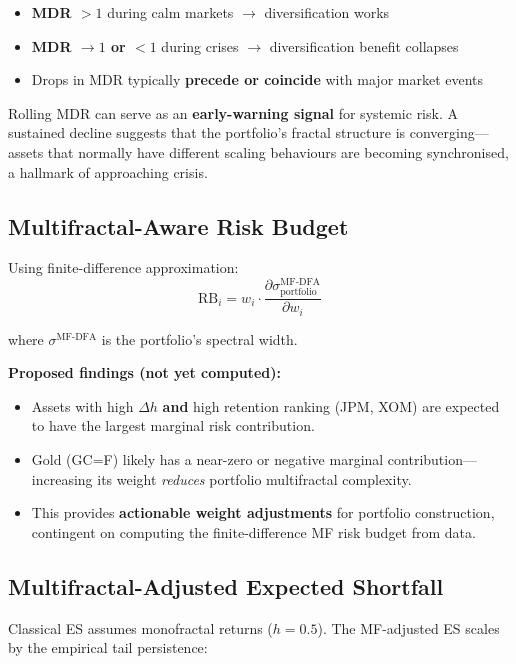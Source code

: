 \documentclass[11pt,a4paper]{article}
\begin{document}
\begin{itemize}[nosep]
\item \textbf{MDR $> 1$} during calm markets $\to$ diversification works
\item \textbf{MDR $\to 1$ or $< 1$} during crises $\to$ diversification benefit collapses
\item Drops in MDR typically \textbf{precede or coincide} with major market events
\end{itemize}

\begin{tipbox}
Rolling MDR can serve as an \textbf{early-warning signal} for systemic risk. A sustained decline suggests that the portfolio's fractal structure is converging---assets that normally have different scaling behaviours are becoming synchronised, a hallmark of approaching crisis.
\end{tipbox}

\subsection{Multifractal-Aware Risk Budget}

Using finite-difference approximation:
\[
\text{RB}_i = w_i \cdot \frac{\partial \sigma_{\text{portfolio}}^{\text{MF-DFA}}}{\partial w_i}
\]

where $\sigma^{\text{MF-DFA}}$ is the portfolio's spectral width.

\textbf{Proposed findings (not yet computed):}
\begin{itemize}[nosep]
\item Assets with high $\Delta h$ \textbf{and} high retention ranking (JPM, XOM) are expected to have the largest marginal risk contribution.
\item Gold (GC=F) likely has a near-zero or negative marginal contribution---increasing its weight \emph{reduces} portfolio multifractal complexity.
\item This provides \textbf{actionable weight adjustments} for portfolio construction, contingent on computing the finite-difference MF risk budget from data.
\end{itemize}

\subsection{Multifractal-Adjusted Expected Shortfall}

Classical ES assumes monofractal returns ($h = 0.5$). The MF-adjusted ES scales by the empirical tail persistence:
\end{document}
